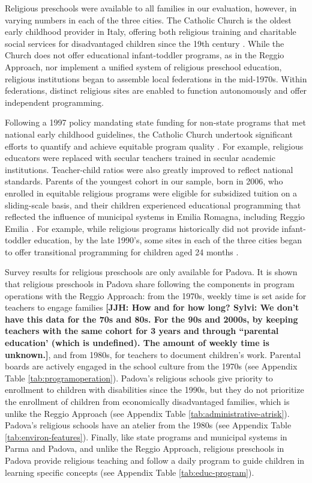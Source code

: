 Religious preschools were available to all families in our evaluation, however, in varying numbers in each of the three cities. The Catholic Church is the oldest early childhood provider in Italy, offering both religious training and charitable social services for disadvantaged children since the 19th century \citep{OECD_2001_Italy-Country-Note}. While the Church does not offer educational infant-toddler programs, as in the Reggio Approach, nor implement a unified system of religious preschool education, religious institutions began to assemble local federations in the mid-1970s. Within federations, distinct religious sites are enabled to function autonomously and offer independent programming.

Following a 1997 policy mandating state funding for non-state programs that met national early childhood guidelines, the Catholic Church undertook significant efforts to quantify and achieve equitable program quality \citep{Malizia-Cicatelli_2011_BOOK_Catholic-School}. For example, religious educators were replaced with secular teachers trained in secular academic institutions. Teacher-child ratios were also greatly improved to reflect national standards. Parents of the youngest cohort in our sample, born in 2006, who enrolled in equitable religious programs were eligible for subsidized tuition on a sliding-scale basis, and their children experienced educational programming that reflected the influence of municipal systems in Emilia Romagna, including Reggio Emilia \citep{Hohnerlein_2009_Paradox-Public-Preschools,OECD_2001_Italy-Country-Note}. For example, while religious programs historically did not provide infant-toddler education, by the late 1990's, some sites in each of the three cities began to offer transitional programming for children aged 24 months \citep{Malizia-Cicatelli_2011_BOOK_Catholic-School,CEHD_2016_Historical-Analysis}.

Survey results for religious preschools are only available for Padova. It is shown that religious preschools in Padova share following the components in program operations with the Reggio Approach: from the 1970s, weekly time is set aside for teachers to engage families \textbf{[JJH: How and for how long? Sylvi: We don't have this data for the 70s and 80s. For the 90s and 2000s, by keeping teachers with the same cohort for 3 years and through ``parental education' (which is undefined). The amount of weekly time is unknown.]}, and from 1980s, for teachers to document children's work. Parental boards are actively engaged in the school culture from the 1970s (see Appendix Table \ref{tab:programoperation}). Padova's religious schools give priority to enrollment to children with disabilities since the 1990s, but they do not prioritize the enrollment of children from economically disadvantaged families, which is unlike the Reggio Approach (see Appendix Table \ref{tab:administrative-atrisk}). Padova's religious schools have an atelier from the 1980s (see Appendix Table \ref{tab:environ-features}). Finally, like state programs and municipal systems in Parma and Padova, and unlike the Reggio Approach, religious preschools in Padova provide religious teaching and follow a daily program to guide children in learning specific concepts (see Appendix Table \ref{tab:educ-program}).

